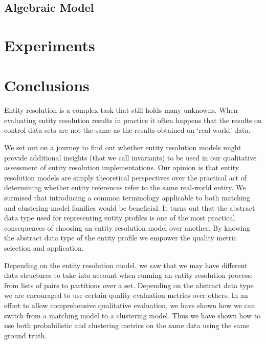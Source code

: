 \documentclass[journal]{IEEEtran}
\begin{document}
    \subsection{Algebraic Model}\label{subsec:Algebraic Model}
    

    \section{Experiments}\label{sec:Experiments}
    

    \section{Conclusions}\label{sec:Conclusions}

    Entity resolution is a complex task that still holds many unknowns.
    When evaluating entity resolution results in practice it often happens that
    the results on control data sets are not the same as the results obtained
    on `real-world' data.
    
    We set out on a journey to find out whether entity resolution models might
    provide additional insights (that we call invariants) to be used in our
    qualitative assessment of entity resolution implementations.
    Our opinion is that entity resolution models are simply theoretical
    perspectives over the practical act of determining whether entity references
    refer to the same real-world entity.
    We surmised that introducing a common terminology applicable to both
    matching and clustering model families would be beneficial.
    It turns out that the abstract data type used for representing entity
    profiles is one of the most practical consequences of choosing an entity
    resolution model over another.
    By knowing the abstract data type of the entity profile we empower the
    quality metric selection and application.
    
    Depending on the entity resolution model, we saw that we may have different
    data structures to take into account when running an entity resolution
    process: from lists of pairs to partitions over a set.
    Depending on the abstract data type we are encouraged to use certain quality
    evaluation metrics over others.
    In an effort to allow comprehensive qualitative evaluation, we have shown
    how we can switch from a matching model to a clustering model.
    Thus we have shown how to use both probabilistic and clustering metrics on
    the same data using the same ground truth.
\end{document}
